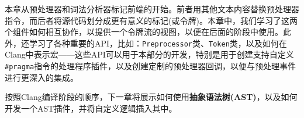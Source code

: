 本章从预处理器和词法分析器标记前端的开始。前者用其他文本内容替换预处理器指令，而后者将源代码划分成更有意义的标记(或令牌)。本章中，我们学习了这两个组件如何相互协作，以提供一个令牌流的视图，以便在后面的阶段中使用。此外，还学习了各种重要的API，比如：\texttt{Preprocessor}类、\texttt{Token}类，以及如何在Clang中表示宏——这些API可以用于本部分的开发，特别是用于创建支持自定义\texttt{\#pragma}指令的处理程序插件，以及创建定制的预处理器回调，以便与预处理事件进行更深入的集成。

按照Clang编译阶段的顺序，下一章将展示如何使用\textbf{抽象语法树(AST)}，以及如何开发一个AST插件，并将自定义逻辑插入其中。